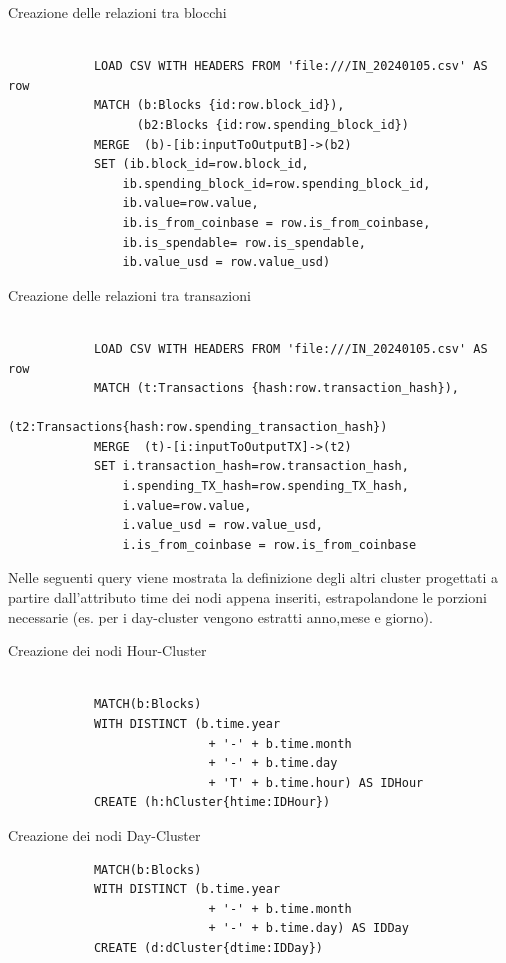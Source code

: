\vspace{5mm}
\begin{center}
Creazione delle relazioni tra blocchi
   \begin{lstlisting}

            LOAD CSV WITH HEADERS FROM 'file:///IN_20240105.csv' AS row
            MATCH (b:Blocks {id:row.block_id}), 
                  (b2:Blocks {id:row.spending_block_id})
            MERGE  (b)-[ib:inputToOutputB]->(b2)
            SET (ib.block_id=row.block_id, 
                ib.spending_block_id=row.spending_block_id, 
                ib.value=row.value,
                ib.is_from_coinbase = row.is_from_coinbase, 
                ib.is_spendable= row.is_spendable, 
                ib.value_usd = row.value_usd)
\end{lstlisting} 
\end{center}
\newpage \thispagestyle{mystyle}
\begin{center}
Creazione delle relazioni tra transazioni
\begin{lstlisting}

            LOAD CSV WITH HEADERS FROM 'file:///IN_20240105.csv' AS row
            MATCH (t:Transactions {hash:row.transaction_hash}), 
                  (t2:Transactions{hash:row.spending_transaction_hash})
            MERGE  (t)-[i:inputToOutputTX]->(t2)
            SET i.transaction_hash=row.transaction_hash,
                i.spending_TX_hash=row.spending_TX_hash,
                i.value=row.value,
                i.value_usd = row.value_usd,
                i.is_from_coinbase = row.is_from_coinbase
\end{lstlisting} 
\end{center}
 Nelle seguenti query viene mostrata la definizione degli altri cluster progettati a partire dall'attributo time dei nodi appena inseriti, estrapolandone le porzioni necessarie (es. per i day-cluster vengono estratti anno,mese e giorno).
\vspace{5mm}
\begin{center}
Creazione dei nodi Hour-Cluster
   \begin{lstlisting}

            MATCH(b:Blocks)  
            WITH DISTINCT (b.time.year 
                            + '-' + b.time.month 
                            + '-' + b.time.day 
                            + 'T' + b.time.hour) AS IDHour
            CREATE (h:hCluster{htime:IDHour})
\end{lstlisting} 
\end{center}
\vspace{3mm}
 \begin{center}
Creazione dei nodi Day-Cluster

   \begin{lstlisting}
            MATCH(b:Blocks)  
            WITH DISTINCT (b.time.year 
                            + '-' + b.time.month 
                            + '-' + b.time.day) AS IDDay
            CREATE (d:dCluster{dtime:IDDay})
\end{lstlisting} 
\end{center}


